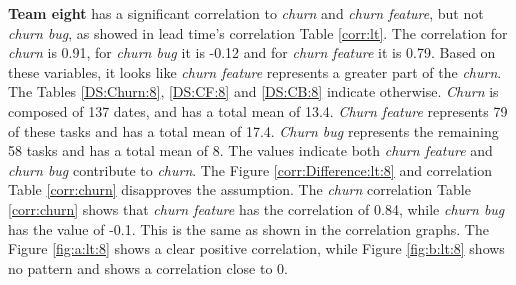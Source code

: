 \documentclass[UKenglish]{ifimaster}  %
\begin{document}
\textbf{Team eight} has a significant correlation to \textit{churn} and \textit{churn feature}, but not \textit{churn bug}, as showed in lead time's correlation Table  \ref{corr:lt}. The correlation for \textit{churn} is 0.91, for \textit{churn bug} it is  -0.12 and for \textit{churn feature} it is 0.79. Based on these variables, it looks like \textit{churn feature} represents a greater part of the \textit{churn}. The Tables \ref{DS:Churn:8}, \ref{DS:CF:8} and \ref{DS:CB:8} indicate otherwise. \textit{Churn} is composed of 137 dates, and has a total mean of 13.4. \textit{Churn feature} represents 79 of these tasks and has a total mean of 17.4. \textit{Churn bug} represents the remaining 58 tasks and has a total mean of 8.  The values indicate both \textit{churn feature} and \textit{churn bug} contribute to \textit{churn}. The Figure \ref{corr:Difference:lt:8} and correlation Table \ref{corr:churn} disapproves the assumption. The \textit{churn} correlation Table \ref{corr:churn} shows that \textit{churn feature} has the correlation of 0.84, while \textit{churn bug} has the value of -0.1. This is the same as shown in the correlation graphs. The Figure \ref{fig:a:lt:8} shows a clear positive correlation, while Figure \ref{fig:b:lt:8} shows no pattern and shows a correlation close to 0. 
\end{document}
